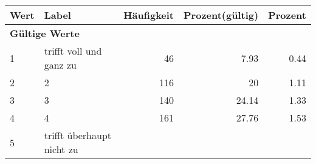      \begin{longtable}{lXrrr}
     \toprule
     \textbf{Wert} & \textbf{Label} & \textbf{Häufigkeit} & \textbf{Prozent(gültig)} & \textbf{Prozent} \\
     \endhead
     \midrule
     \multicolumn{5}{l}{\textbf{Gültige Werte}}\\

     1 &
     \multicolumn{1}{X}{ trifft voll und ganz zu   } &


       \num{46} &
       \num[round-mode=places,round-precision=2]{7.93} &
         \num[round-mode=places,round-precision=2]{0.44} \\

     2 &
     \multicolumn{1}{X}{ 2   } &


       \num{116} &
       \num[round-mode=places,round-precision=2]{20} &
         \num[round-mode=places,round-precision=2]{1.11} \\

     3 &
     \multicolumn{1}{X}{ 3   } &


       \num{140} &
       \num[round-mode=places,round-precision=2]{24.14} &
         \num[round-mode=places,round-precision=2]{1.33} \\

     4 &
     \multicolumn{1}{X}{ 4   } &


       \num{161} &
       \num[round-mode=places,round-precision=2]{27.76} &
         \num[round-mode=places,round-precision=2]{1.53} \\

     5 &
     \multicolumn{1}{X}{ trifft überhaupt nicht zu   } &



\end{longtable}
